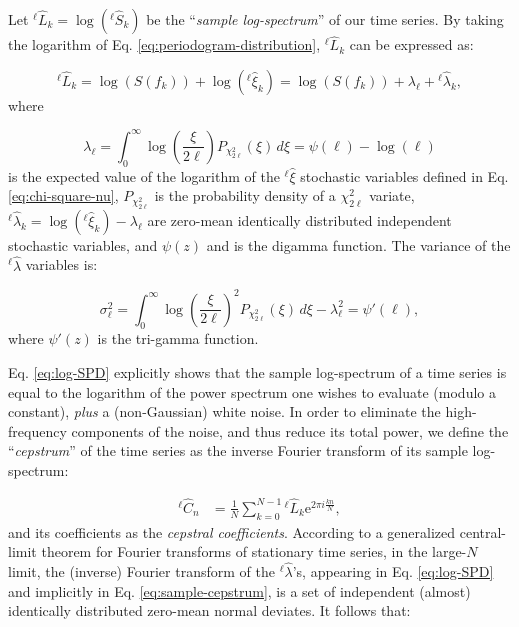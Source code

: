 Let $^{\ell}\hat{L}_{k} =\log (^{\ell} \hat{S}_{k} )$ be the ``\emph{sample log-spectrum}'' of our time series. By taking the logarithm of Eq. \eqref{eq:periodogram-distribution}, $^{\ell}\hat{L}_{k}$ can be expressed as:

\begin{equation}
^\ell\hat{L}_{k} = \log\left(S(f_k) \right) + \log\left( ^\ell{\hat\xi}_k\right) = \log\left(S(f_k) \right) + \lambda_\ell + {^{\ell}\hat{\lambda}}_{k}, \label{eq:log-SPD}
\end{equation}
where 

\begin{equation}
\lambda_{\ell} = \int_0^\infty \log\left (\frac{\xi}{2\ell}\right ) P_{\chi^2_{2\ell}}(\xi) \, d\xi = \psi(\ell)-\log(\ell) \label{eq:lambda-ell}
\end{equation}
is the expected value of the logarithm of the ${^\ell}\hat\xi$ stochastic variables defined in Eq. \eqref{eq:chi-square-nu}, $P_{\chi^2_{2\ell}}$ is the probability density of a $\chi^2_{2\ell}$ variate, $^{\ell}\hat{\lambda}_k = \log\left( ^\ell{\hat\xi}_k\right)  - \lambda_\ell$ are zero-mean identically distributed independent stochastic variables, and $\psi(z)$ and is the digamma function.\cite{PolyGamma}
The variance of the ${^\ell}\hat\lambda$ variables is:

\begin{equation}
\sigma_{\ell}^{2}  = \int_0^\infty \log\left (\frac{\xi}{2\ell}\right )^2 P_{\chi^2_{2\ell}}(\xi) \, d\xi - \lambda_{\ell}^2 =\psi'(\ell),\label{eq:sigma2-ell}
\end{equation}
where $\psi'(z)$ is the tri-gamma function.\cite{PolyGamma} 

Eq. \eqref{eq:log-SPD} explicitly shows that the sample log-spectrum of a  time series is equal to the logarithm  of the power spectrum one wishes to evaluate (modulo a constant), \emph{plus} a (non-Gaussian) white noise. In order to eliminate the high-frequency components of the noise, and thus reduce its total power, we define the ``\emph{cepstrum}'' of the time series as the inverse Fourier transform of its sample log-spectrum:\cite{Childers1977}

\begin{align}
^{\ell} \hat C_{n} &= \frac{1}{N}\sum_{k=0}^{N-1} {^{\ell} \hat L_{k}}\mathrm{e}^{2\pi i\frac{kn}{N}}, 
 \label{eq:sample-cepstrum}
\end{align}
and its coefficients as the \emph{cepstral coefficients}. According to a generalized central-limit theorem  for Fourier transforms of stationary time series,\cite{Peligrad2010} in the large-$N$ limit, the (inverse) Fourier transform of the $^\ell{\hat {\lambda}}$'s, appearing in Eq. \eqref{eq:log-SPD} and implicitly in Eq. \eqref{eq:sample-cepstrum}, is a set of independent (almost) identically distributed zero-mean normal deviates. It follows that:

